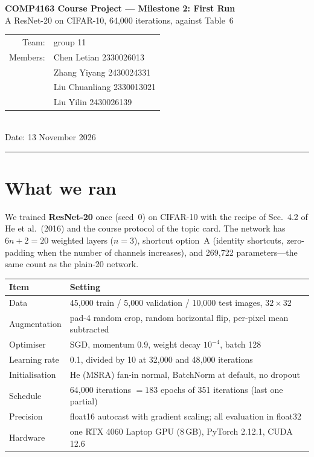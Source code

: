 \documentclass[11pt,a4paper]{article}
\begin{document}
\begin{center}
{\Large\bfseries COMP4163 Course Project --- Milestone 2: First Run}\\[4pt]
{\large A ResNet-20 on CIFAR-10, 64{,}000 iterations, against Table~6}\\[8pt]
\begin{tabular}{@{}rl@{}}
Team: & group 11 \\
Members: & Chen Letian 2330026013 \\
         & Zhang Yiyang 2430024331 \\
         & Liu Chuanliang 2330013021 \\
         & Liu Yilin 2430026139 \\
\end{tabular}\\[8pt]
Date: 13 November 2026
\end{center}

\vspace{-2pt}
\noindent\rule{\textwidth}{0.4pt}

\section{What we ran}

We trained \textbf{ResNet-20} once (seed~0) on CIFAR-10 with the recipe of
Sec.~4.2 of He et al.~(2016) and the course protocol of the topic card. The
network has $6n+2=20$ weighted layers ($n=3$), shortcut option~A (identity
shortcuts, zero-padding when the number of channels increases), and
269{,}722{} parameters---the same count as the plain-20 network.

\begin{center}
\begin{tabular}{@{}ll@{}}
\toprule
Item & Setting \\
\midrule
Data & 45{,}000 train / 5{,}000 validation / 10{,}000 test images, $32\times32$ \\
Augmentation & pad-4 random crop, random horizontal flip, per-pixel mean subtracted \\
Optimiser & SGD, momentum 0.9, weight decay $10^{-4}$, batch 128 \\
Learning rate & 0.1, divided by 10 at 32{,}000 and 48{,}000 iterations \\
Initialisation & He (MSRA) fan-in normal, BatchNorm at default, no dropout \\
Schedule & 64{,}000 iterations $=183$ epochs of 351 iterations (last one partial) \\
Precision & float16 autocast with gradient scaling; all evaluation in float32 \\
Hardware & one RTX 4060 Laptop GPU (8\,GB), PyTorch 2.12.1{}, CUDA 12.6{} \\
\bottomrule
\end{tabular}
\end{center}
\end{document}
